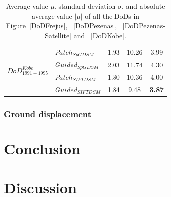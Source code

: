 \begin{table}
\begin{tabular}{||l|l|c|c|c||}
		
		\multirow{6}{*}{$DoD^{Kobe}_{1991-1995}$}
		&${Patch_{SpGDSM}}$ & 1.93 & 10.26 & 3.99\\
		&${Guided_{SpGDSM}}$ & 2.03 & 11.74 & 4.30\\
		&${Patch_{SIFTDSM}}$ & 1.80 & 10.36 & 4.00\\
		&${Guided_{SIFTDSM}}$ & 1.84 & 9.48 & \textbf{3.87}\\

		
	\end{tabular}
	\caption{Average value $\mu$, standard deviation $\sigma$, and absolute average value $|\mu|$ of all the \ac{DoD}s in Figure~\ref{DoDFrejus}, ~\ref{DoDPezenas}, ~\ref{DoDPezenas-Satellite} and ~\ref{DoDKobe}.}
	\label{DoDStatistic}
\end{table}

\subsubsection{Ground displacement}

\section{Conclusion}

\section{Discussion}
